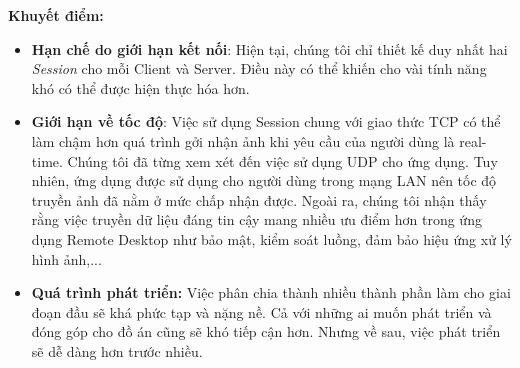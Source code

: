 \textbf{Khuyết điểm: }
\begin{itemize}
	\item \textbf{Hạn chế do giới hạn kết nối}: Hiện tại, chúng tôi chỉ thiết kế duy nhất hai \textit{Session} cho mỗi Client và Server. Điều này có thể khiến cho vài tính năng khó có thể được hiện thực hóa hơn. 
	\item \textbf{Giới hạn về tốc độ}: Việc sử dụng Session chung với giao thức TCP có thể làm chậm hơn quá trình gởi nhận ảnh khi yêu cầu của người dùng là real-time. Chúng tôi đã từng xem xét đến việc sử dụng UDP cho ứng dụng. Tuy nhiên, ứng dụng được sử dụng cho người dùng trong mạng LAN nên tốc độ truyền ảnh đã nằm ở mức chấp nhận được. Ngoài ra, chúng tôi nhận thấy rằng việc truyền dữ liệu đáng tin cậy mang nhiều ưu điểm hơn trong ứng dụng Remote Desktop như bảo mật, kiểm soát luồng, đảm bảo hiệu ứng xử lý hình ảnh,...
	\item \textbf{Quá trình phát triển: } Việc phân chia thành nhiều thành phần làm cho giai đoạn đầu sẽ khá phức tạp và nặng nề. Cả với những ai muốn phát triển và đóng góp cho đồ án cũng sẽ khó tiếp cận hơn. Nhưng về sau, việc phát triển sẽ dễ dàng hơn trước nhiều.
\end{itemize}



